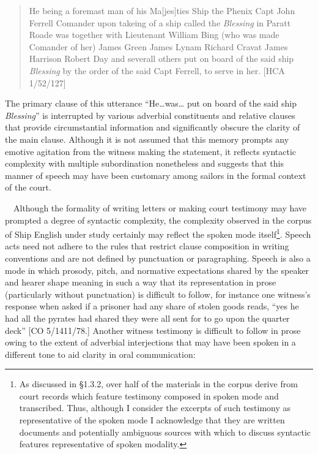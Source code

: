 \begin{quotation}
He being a foremast man of his Ma[jes]ties Ship the Phenix Capt John Ferrell Comander upon takeing of a ship called the \textit{Blessing} in Paratt Roade was together with Lieutenant William Bing (who was made Comander of her) James Green James Lynam Richard Cravat James Harrison Robert Day and severall others put on board of the said ship \textit{Blessing} by the order of the said Capt Ferrell, to serve in her. [HCA 1/52/127]

\end{quotation}
\begin{styleStandard}
The primary clause of this utterance “He…was… put on board of the said ship \textit{Blessing}” is interrupted by various adverbial constituents and relative clauses that provide circumstantial information and significantly obscure the clarity of the main clause. Although it is not assumed that this memory prompts any emotive agitation from the witness making the statement, it reflects syntactic complexity with multiple subordination nonetheless and suggests that this manner of speech may have been customary among sailors in the formal context of the court. 
\end{styleStandard}


\begin{styleStandard}
\ \ Although the formality of writing letters or making court testimony may have prompted a degree of syntactic complexity, the complexity observed in the corpus of Ship English under study certainly may reflect the spoken mode itself\footnote{ As discussed in §1.3.2, over half of the materials in the corpus derive from court records which feature testimony composed in spoken mode and transcribed. Thus, although I consider the excerpts of such testimony as representative of the spoken mode I acknowledge that they are written documents and potentially ambiguous sources with which to discuss syntactic features representative of spoken modality. }. Speech acts need not adhere to the rules that restrict clause composition in writing conventions and are not defined by punctuation or paragraphing. Speech is also a mode in which prosody, pitch, and normative expectations shared by the speaker and hearer shape meaning in such a way that its representation in prose (particularly without punctuation) is difficult to follow, for instance one witness’s response when asked if a prisoner had any share of stolen goods reads, “yes he had all the pyrates had shared they were all sent for to go upon the quarter deck” [CO 5/1411/78.] Another witness testimony is difficult to follow in prose owing to the extent of adverbial interjections that may have been spoken in a different tone to aid clarity in oral communication:
\end{styleStandard}


